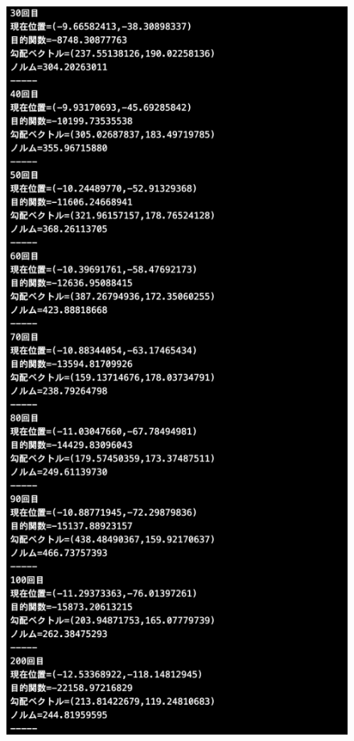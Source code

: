 \documentclass[12pt]{jarticle}
\begin{document}
\begin{figure}[h]
    \begin{minipage}{0.5\hsize}
        \begin{center}
            \includegraphics[scale=0.2]{kadai1_2s_out2_3_2.png}
        \end{center}

\end{minipage}
\end{figure}
\end{document}
